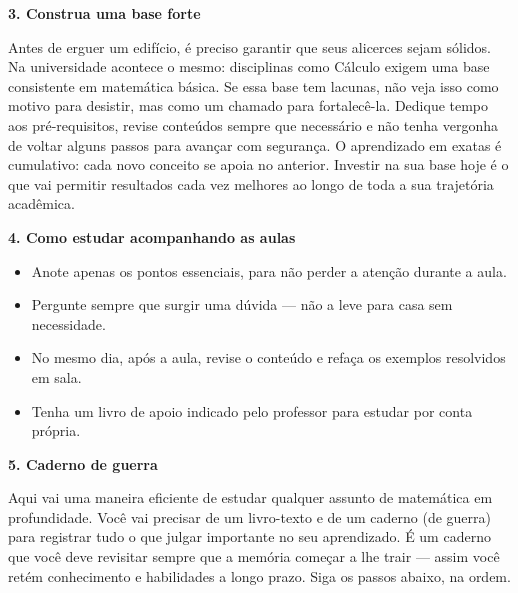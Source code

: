 \documentclass[11pt]{article}
\newcommand{\topico}[1]{%
  \vspace{7pt}
  {\Large\bfseries\color{accent} #1}\par
  \vspace{2pt}
}
\begin{document}
\topico{3. Construa uma base forte}
Antes de erguer um edifício, é preciso garantir que seus alicerces sejam sólidos. Na universidade acontece o mesmo: disciplinas como Cálculo exigem uma base consistente em matemática básica. Se essa base tem lacunas, não veja isso como motivo para desistir, mas como um chamado para fortalecê-la. Dedique tempo aos pré-requisitos, revise conteúdos sempre que necessário e não tenha vergonha de voltar alguns passos para avançar com segurança. O aprendizado em exatas é cumulativo: cada novo conceito se apoia no anterior. Investir na sua base hoje é o que vai permitir resultados cada vez melhores ao longo de toda a sua trajetória acadêmica.

\topico{4. Como estudar acompanhando as aulas}
\begin{itemize}
  \item Anote apenas os pontos essenciais, para não perder a atenção durante a aula.
  \item Pergunte sempre que surgir uma dúvida — não a leve para casa sem necessidade.
  \item No mesmo dia, após a aula, revise o conteúdo e refaça os exemplos resolvidos em sala.
  \item Tenha um livro de apoio indicado pelo professor para estudar por conta própria.
\end{itemize}

\newpage

\topico{5. Caderno de guerra}
Aqui vai uma maneira eficiente de estudar qualquer assunto de matemática em profundidade. Você vai precisar de um livro-texto e de um caderno (de guerra) para registrar tudo o que julgar importante no seu aprendizado. É um caderno que você deve revisitar sempre que a memória começar a lhe trair — assim você retém conhecimento e habilidades a longo prazo. Siga os passos abaixo, na ordem.
\end{document}
